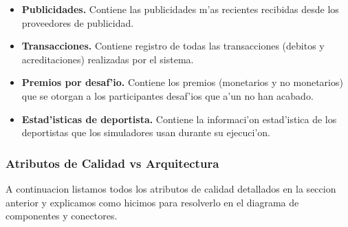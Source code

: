 \begin{itemize}
	\item \textbf{Publicidades.} Contiene las publicidades m'as recientes recibidas desde los proveedores de publicidad.
	\item \textbf{Transacciones.} Contiene registro de todas las transacciones (debitos y acreditaciones) realizadas por el sistema.
	\item \textbf{Premios por desaf'io.} Contiene los premios (monetarios y no monetarios) que se otorgan a los participantes desaf'ios que a'un no han acabado.
	\item \textbf{Estad'isticas de deportista.} Contiene la informaci'on estad'istica de los deportistas que los simuladores usan durante su ejecuci'on.
	
\end{itemize}

\subsubsection{Atributos de Calidad vs Arquitectura}
A continuacion listamos todos los atributos de calidad detallados en la seccion anterior y explicamos como hicimos para resolverlo en el diagrama de componentes y conectores.

